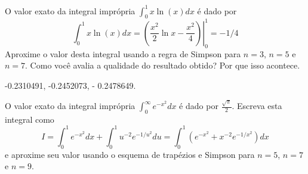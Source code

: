 

\begin{exer}
O valor exato da integral imprópria $\int_0^1x\ln(x)dx$ é dado por
$$\int_0^1x\ln(x)dx=\left.\left(\frac{x^2}{2}\ln x-\frac{x^2}{4}\right)\right|_0^1=-1/4$$
Aproxime o valor desta integral usando a regra  de Simpson para $n=3$, $n=5$ e $n=7$. Como você avalia a qualidade do resultado obtido? Por que isso acontece.
\end{exer}
\begin{resp}
  
-0.2310491, -0.2452073, - 0.2478649.    
  
\end{resp}

\begin{exer}
O valor exato da integral imprópria $\int_0^\infty e^{-x^2}dx$ é dado por $\frac{\sqrt{\pi}}{2}$.
Escreva esta integral como
$$I=\int_0^1 e^{-x^2}dx+\int_0^1 u^{-2} e^{-1/u^2}du=\int_0^1 \left(e^{-x^2}+x^{-2}e^{-1/x^2}\right)dx$$
e aproxime seu valor usando o esquema de trapézios e Simpson para $n=5$, $n=7$ e $n=9$.
\end{exer}

